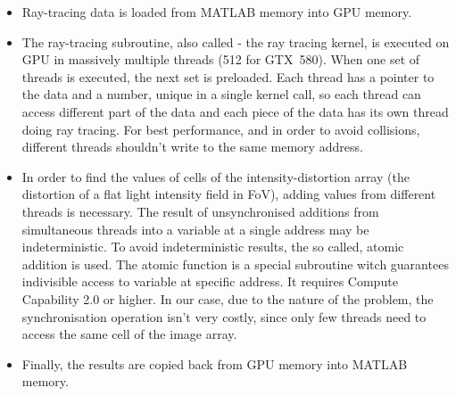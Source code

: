 \documentclass[preprint,review,12pt,dvips]{elsarticle}
\begin{document}
\begin{itemize}
\item Ray-tracing data is loaded from MATLAB memory into GPU memory.

\item The ray-tracing subroutine, also called - the ray tracing kernel, is executed on GPU in massively multiple threads
(512 for GTX~580). When one set of threads is executed, the next set is preloaded. Each thread has a pointer to the data
and a number, unique in a single kernel call, so each thread can access different part of the data and each piece of the
data has its own thread doing ray tracing. For best performance, and in order to avoid collisions, different threads
shouldn't write to the same memory address.

\item In order to find the values of cells of the intensity-distortion array (the distortion of a flat light intensity
field in FoV), adding values from different threads is necessary. The result of unsynchronised additions from simultaneous
threads into a variable at a single address may be indeterministic. To avoid indeterministic results, the so called,
atomic addition is used. The atomic function is a special subroutine witch guarantees indivisible access to variable at
specific address. It requires Compute Capability 2.0 or higher. In our case, due to the nature of the problem, the
synchronisation operation isn't very costly, since only few threads need to access the same cell of the image array.

\item Finally, the results are copied back from GPU memory into MATLAB memory.
\end{itemize}
\end{document}
